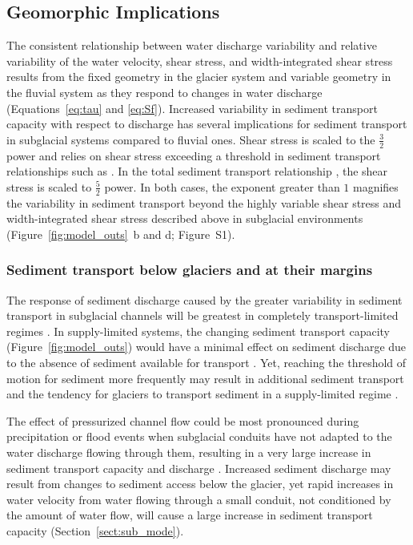 \documentclass[11pt]{article}
\begin{document}
\begin{spacing}{1}
  
  
  \subsection{Geomorphic Implications}
  \label{sect:GI}
  The consistent relationship between water discharge variability and relative variability of the water velocity, shear stress, and width-integrated shear stress results from the fixed geometry in the glacier system and variable geometry in the fluvial system as they respond to changes in water discharge (Equations~\ref{eq:tau} and \ref{eq:Sf}).
  Increased variability in sediment transport capacity with respect to discharge has several implications for sediment transport in subglacial systems compared to fluvial ones.
  Shear stress is scaled to the $\frac{3}{2}$ power  and relies on shear stress exceeding a threshold in sediment transport relationships  such as \citet{meyer1948}.
  In the total sediment transport relationship \citet{engelund1967}, the shear stress is scaled to $\frac{5}{2}$ power.
  In both cases, the exponent greater than $1$ magnifies the variability in sediment transport beyond the highly variable shear stress and width-integrated shear stress described above in subglacial environments (Figure~\ref{fig:model_outs}\, b and d; Figure~S1).

  \subsubsection{Sediment transport below glaciers and at their margins}
  
  The response of sediment discharge caused by the greater variability in sediment transport in subglacial channels will be greatest in completely transport-limited regimes \citep[e.g.][]{kasmalkar2019}.
  In supply-limited systems, the changing sediment transport capacity (Figure~\ref{fig:model_outs}) would have a minimal effect on sediment discharge due to the absence of sediment available for transport \citep{delaney2019}.
  Yet, reaching the threshold of motion for sediment more frequently may result in additional sediment transport and the tendency for glaciers to transport sediment in a supply-limited regime \citep[e.g.][]{herman2015}.
  
  The effect of pressurized channel flow could be most pronounced during precipitation or flood events when subglacial conduits have not adapted to the water discharge flowing through them, resulting in a very large increase in sediment transport capacity and discharge \citep[e.g.][]{cowan1988,delaney2019}.
  Increased sediment discharge may result from changes to sediment access below the glacier, yet rapid increases in water velocity from water flowing through a small conduit, not conditioned by the amount of water flow, will cause a large increase in sediment transport capacity (Section~\ref{sect:sub_mode}).
  

\end{spacing}
\end{document}
